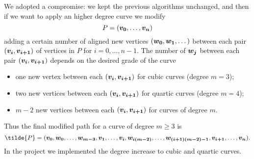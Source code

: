 \documentclass[dissertation.tex]{subfiles}
\begin{document}
We adopted a compromise: we kept the previous algorithms unchanged, and
then if we want to apply an higher degree \bs curve we modify 
\begin{equation*}
P=(\boldsymbol{v_0},\dots,\boldsymbol{v_n})  
\end{equation*}
adding a certain number of aligned new vertices
$(\boldsymbol{w_0},\boldsymbol{w_1},\dots)$ between each pair 
$(\boldsymbol{v_i},\boldsymbol{v_{i+1}})$ of vertices in $P$ for $i=0,\dots,n-1$. The
number of $\boldsymbol{w_j}$
between each pair $(\boldsymbol{v_i},\boldsymbol{v_{i+1}})$ depends on the desired
grade of the curve
\begin{itemize}
\item one new vertex between each $(\boldsymbol{v_i},\boldsymbol{v_{i+1}})$ for cubic
  \bs curves (degree $m=3$);
\item two new vertices between each $(\boldsymbol{v_i},\boldsymbol{v_{i+1}})$ for quartic
  \bs curves (degree $m=4$);
\item $m-2$ new vertices between each $(\boldsymbol{v_i},\boldsymbol{v_{i+1}})$ for
  \bs curves of degree $m$.
\end{itemize}
Thus the final modified path for a \bs curve of degree $m\ge 3$ is
\begin{equation*}
  \tilde{P}=(\ve{v_0},\ve{w_0},\dots,\ve{w_{m-3}},\ve{v_1},\dots,\ve{v_i},\ve{w_{i(m-2)}},\dots,\ve{w_{(i+1)(m-2)-1}},\ve{v_{i+1}},\dots,\ve{v_n}).
\end{equation*}
In the project we implemented the degree increase to cubic and quartic
curves.
\end{document}

